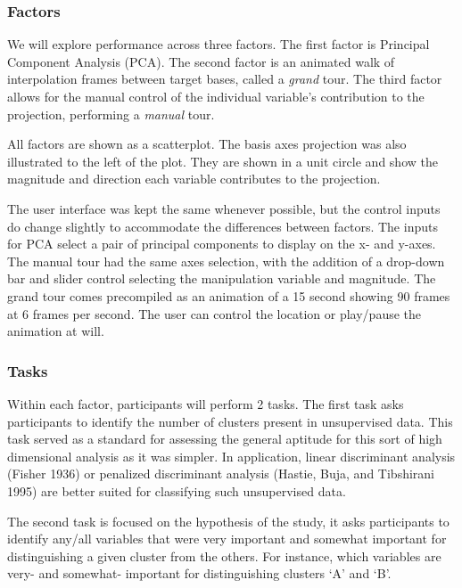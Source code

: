 \documentclass[
  11,
]{article}
\begin{document}
\hypertarget{sec:factors}{%
\subsubsection{Factors}\label{sec:factors}}

We will explore performance across three factors. The first factor is Principal Component Analysis (PCA). The second factor is an animated walk of interpolation frames between target bases, called a \emph{grand} tour. The third factor allows for the manual control of the individual variable's contribution to the projection, performing a \emph{manual} tour.

All factors are shown as a scatterplot. The basis axes projection was also illustrated to the left of the plot. They are shown in a unit circle and show the magnitude and direction each variable contributes to the projection.

The user interface was kept the same whenever possible, but the control inputs do change slightly to accommodate the differences between factors. The inputs for PCA select a pair of principal components to display on the x- and y-axes. The manual tour had the same axes selection, with the addition of a drop-down bar and slider control selecting the manipulation variable and magnitude. The grand tour comes precompiled as an animation of a 15 second showing 90 frames at 6 frames per second. The user can control the location or play/pause the animation at will.

\hypertarget{sec:tasks}{%
\subsubsection{Tasks}\label{sec:tasks}}

Within each factor, participants will perform 2 tasks. The first task asks participants to identify the number of clusters present in unsupervised data. This task served as a standard for assessing the general aptitude for this sort of high dimensional analysis as it was simpler. In application, linear discriminant analysis (Fisher 1936) or penalized discriminant analysis (Hastie, Buja, and Tibshirani 1995) are better suited for classifying such unsupervised data.

The second task is focused on the hypothesis of the study, it asks participants to identify any/all variables that were very important and somewhat important for distinguishing a given cluster from the others. For instance, which variables are very- and somewhat- important for distinguishing clusters `A' and `B'.
\end{document}
